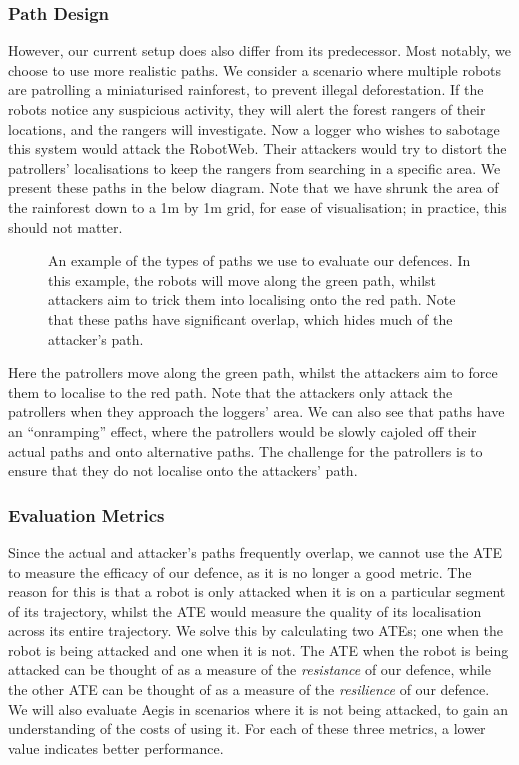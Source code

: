 \subsubsection{Path Design}
However, our current setup does also differ from its predecessor. Most notably, we choose to use more realistic paths. We consider a scenario where multiple robots are patrolling a miniaturised rainforest, to prevent illegal deforestation. If the robots notice any suspicious activity, they will alert the forest rangers of their locations, and the rangers will investigate. Now a logger who wishes to sabotage this system would attack the RobotWeb. Their attackers would try to distort the patrollers' localisations to keep the rangers from searching in a specific area. We present these paths in the below diagram. Note that we have shrunk the area of the rainforest down to a 1m by 1m grid, for ease of visualisation; in practice, this should not matter.

\begin{figure}[!h]
	\centering
	

	\caption[Paths used to evaluate defences]{An example of the types of paths we use to evaluate our defences. In this example, the robots will move along the green path, whilst attackers aim to trick them into localising onto the red path. Note that these paths have significant overlap, which hides much of the attacker's path.}
\end{figure}

Here the patrollers move along the green path, whilst the attackers aim to force them to localise to the red path. Note that the attackers only attack the patrollers when they approach the loggers' area. We can also see that paths have an ``onramping'' effect, where the patrollers would be slowly cajoled off their actual paths and onto alternative paths. The challenge for the patrollers is to ensure that they do not localise onto the attackers' path.

\subsubsection{Evaluation Metrics}
Since the actual and attacker's paths frequently overlap, we cannot use the ATE to measure the efficacy of our defence, as it is no longer a good metric. The reason for this is that a robot is only attacked when it is on a particular segment of its trajectory, whilst the ATE would measure the quality of its localisation across its entire trajectory. We solve this by calculating two ATEs; one when the robot is being attacked and one when it is not. The ATE when the robot is being attacked can be thought of as a measure of the \textit{resistance} of our defence, while the other ATE can be thought of as a measure of the \textit{resilience} of our defence. We will also evaluate Aegis in scenarios where it is not being attacked, to gain an understanding of the costs of using it. For each of these three metrics, a lower value indicates better performance.

